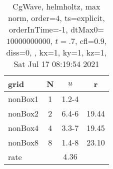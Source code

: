 \begin{table}[H]\tableFont %
\begin{center}
\begin{tabular}{|l|c|c|c|} \hline 
grid  & N &  $ u $ & r \\ \hline 
   nonBox1 &     1 & \num{1.2}{-4} &        \\ \hline
   nonBox2 &     2 & \num{6.4}{-6} & 19.44  \\ \hline
   nonBox4 &     4 & \num{3.3}{-7} & 19.45  \\ \hline
   nonBox8 &     8 & \num{1.4}{-8} & 23.10  \\ \hline
    rate             &       &  $4.36$       &       \\ \hline
\end{tabular}
\caption{CgWave, helmholtz, max norm, order=$4$, ts=explicit, orderInTime=-1, dtMax0=$10000000000$, $t=.7$, cfl=$0.9$, diss=$0$, , kx=1, ky=1, kz=1, Sat Jul 17 08:19:54 2021}\label{table:helmholtzOrder4max}
\end{center}
\end{table}
